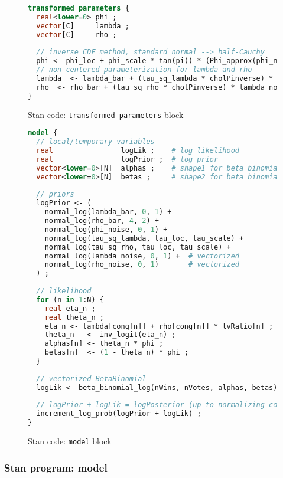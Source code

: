 \begin{figure}
\begin{lstlisting}[language=Stan, frame=trBL]
transformed parameters {
  real<lower=0> phi ;
  vector[C]     lambda ;
  vector[C]     rho ;
  
  // inverse CDF method, standard normal --> half-Cauchy
  phi <- phi_loc + phi_scale * tan(pi() * (Phi_approx(phi_noise) - 0.5)) ;
  // non-centered parameterization for lambda and rho
  lambda  <- lambda_bar + (tau_sq_lambda * cholPinverse) * lambda_noise ;
  rho  <- rho_bar + (tau_sq_rho * cholPinverse) * lambda_noise ;
}
\end{lstlisting}
\caption{Stan code: {\tt transformed parameters} block}
\label{stan_trans_parameters}
\end{figure}



\begin{figure}[p]
\begin{lstlisting}[language=Stan, frame=trBL]
model {
  // local/temporary variables
  real                logLik ;    # log likelihood
  real                logPrior ;  # log prior
  vector<lower=0>[N]  alphas ;    # shape1 for beta_binomial 
  vector<lower=0>[N]  betas ;     # shape2 for beta_binomial
  
  // priors
  logPrior <- (
    normal_log(lambda_bar, 0, 1) + 
    normal_log(rho_bar, 4, 2) + 
    normal_log(phi_noise, 0, 1) +
    normal_log(tau_sq_lambda, tau_loc, tau_scale) +
    normal_log(tau_sq_rho, tau_loc, tau_scale) +
    normal_log(lambda_noise, 0, 1) +  # vectorized
    normal_log(rho_noise, 0, 1)       # vectorized
  ) ;
  
  // likelihood
  for (n in 1:N) {
    real eta_n ;
    real theta_n ;
    eta_n <- lambda[cong[n]] + rho[cong[n]] * lvRatio[n] ;
    theta_n   <- inv_logit(eta_n) ;    
    alphas[n] <- theta_n * phi ;
    betas[n]  <- (1 - theta_n) * phi ;
  }
  
  // vectorized BetaBinomial
  logLik <- beta_binomial_log(nWins, nVotes, alphas, betas) ; 
  
  // logPrior + logLik = logPosterior (up to normalizing constant)
  increment_log_prob(logPrior + logLik) ; 
}
\end{lstlisting}
\caption{Stan code: {\tt model} block}
\label{stan_model}
\end{figure}
%


\subsubsection{Stan program: model}

